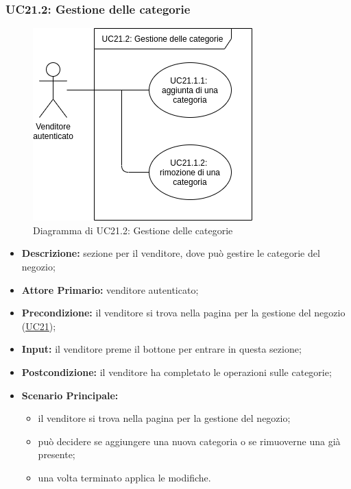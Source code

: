         \subsubsection{UC21.2: Gestione delle categorie}
        \label{sec:UC21.2}
        \begin{figure}[!ht]
            \caption{Diagramma di UC21.2: Gestione delle categorie}
            \vspace{10px}
            \includegraphics[scale=0.5]{../../../Images/AnalisiRequisiti/UC21.2}
            \centering
        \end{figure}
        \begin{itemize}
            \item \textbf{Descrizione:} sezione per il venditore, dove può gestire le categorie del negozio;
            \item \textbf{Attore Primario:} venditore autenticato;
            \item \textbf{Precondizione:} il venditore si trova nella pagina per la gestione del negozio (\hyperref[sec:UC21]{\underline{UC21}});
            \item \textbf{Input:} il venditore preme il bottone per entrare in questa sezione;
            \item \textbf{Postcondizione:} il venditore ha completato le operazioni sulle categorie;
            \item \textbf{Scenario Principale:} 
                \begin{itemize}
                    \item il venditore si trova nella pagina per la gestione del negozio;
                    \item può decidere se aggiungere una nuova categoria o se rimuoverne una già presente;
                    \item una volta terminato applica le modifiche.
                \end{itemize}
        \end{itemize}
